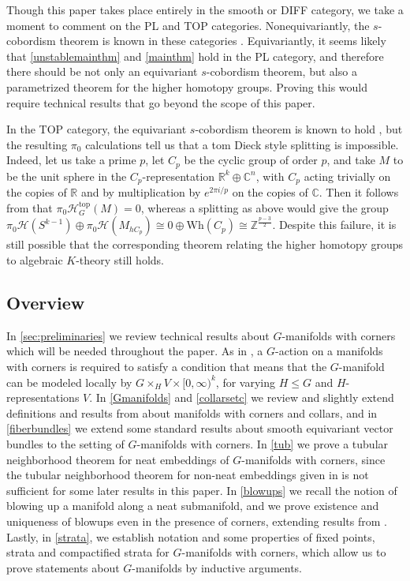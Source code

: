 \documentclass[11pt]{amsart}
\theoremstyle{definition}
\numberwithin{equation}{section}
\numberwithin{figure}{section}
\newcommand{\R}{\mathbb R}
\newcommand{\C}{\mathbb C}
\newcommand{\Z}{\mathbb Z}
\newcommand{\mc}{\mathcal}
\newcommand{\Wh}{\mathrm{Wh}}
\begin{document}
Though this paper takes place entirely in the smooth or DIFF category, we take a moment to comment on the PL and TOP categories. Nonequivariantly, the $s$-cobordism theorem is known in these categories \cite{pl_h_cobordism,steinberger}. Equivariantly, it seems likely that \autoref{unstablemainthm} and \autoref{mainthm} hold in the PL category, and therefore there should be not only an equivariant $s$-cobordism theorem, but also a parametrized theorem for the higher homotopy groups. Proving this would require technical results that go beyond the scope of this paper.

In the TOP category, the equivariant $s$-cobordism theorem is known to hold \cite{steinberger}, but the resulting $\pi_0$ calculations tell us that a tom Dieck style splitting is impossible. Indeed, let us take a prime $p$, let $C_p $ be the cyclic group of order $p$, and take $M$ to be the unit sphere in the $C_p$-representation $\R^k \oplus \C^n$, with $C_p$ acting trivially on the copies of $\R$ and by multiplication by $e^{2\pi i/p}$ on the copies of $\C$. Then it follows from \cite{quinn_jams} that $\pi_0\mc H_G^{\mathrm{top}}(M) = 0$, whereas a splitting as above would give the group $\pi_0\mc H(S^{k-1}) \oplus \pi_0\mc H(M_{hC_p}) \cong 0 \oplus \Wh(C_p) \cong \Z^{\frac{p-3}{2}}$. Despite this failure, it is still possible that the corresponding theorem relating the higher homotopy groups to algebraic $K$-theory still holds.
 
 
 \subsection{Overview} In \autoref{sec:preliminaries} we review technical results about $G$-manifolds with corners which will be needed throughout the paper. As in \cite{GIMM1}, a $G$-action on a manifolds with corners is required to satisfy a condition that means that the $G$-manifold can be modeled locally by $G \times_H V \times [0,\infty)^k$, for varying $H \leq G$ and $H$-representations $V$. In \autoref{Gmanifolds} and \autoref{collarsetc} we review and slightly extend definitions and results from \cite{GIMM1} about manifolds with corners and collars, and in \autoref{fiberbundles} we extend some standard results about smooth equivariant vector bundles to the setting of $G$-manifolds with corners. In  \autoref{tub} we prove a tubular neighborhood theorem for neat embeddings of $G$-manifolds with corners, since the tubular neighborhood theorem for non-neat embeddings given in \cite{GIMM1} is not sufficient for some later results in this paper. In \autoref{blowups} we recall the notion of blowing up a manifold along a neat submanifold, and we prove existence and uniqueness of blowups even in the presence of corners, extending results from \cite{arone_kankaanrinta}. Lastly, in \autoref{strata}, we establish notation and some properties of fixed points, strata and compactified strata for $G$-manifolds with corners, which allow us to prove statements about $G$-manifolds by inductive arguments.
  
\end{document}
